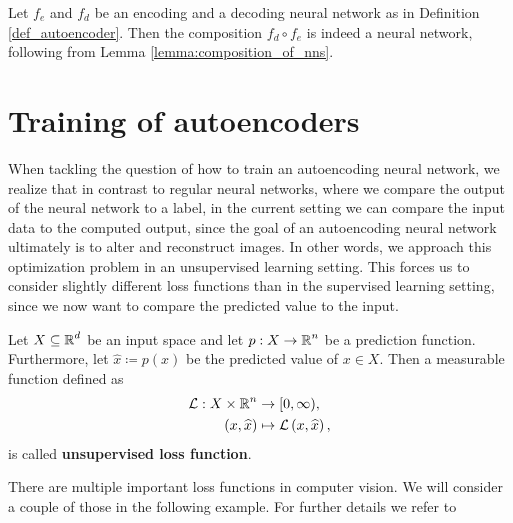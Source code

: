\begin{remark}
Let $f_e$ and $f_d$ be an encoding and a decoding neural network as in Definition \ref{def_autoencoder}. Then the composition $f_d \circ f_e$ is indeed a neural network, following from Lemma \ref{lemma:composition_of_nns}.
\end{remark}


\section{Training of autoencoders}

When tackling the question of how to train an autoencoding neural network, we realize that in contrast to regular neural networks, where we compare the output of the neural network to a label, in the current setting we can compare the input data to the computed output, since the goal of an autoencoding neural network ultimately is to alter and reconstruct images. In other words, we approach this optimization problem in an unsupervised learning setting. This forces us to consider slightly different loss functions than in the supervised learning setting, since we now want to compare the predicted value to the input.


\begin{definition}
Let $X\subseteq \operatorname{\mathbb{R}}^{d}$ be an input space and let $p:X\to \operatorname{\mathbb{R}}^{n}$ be a prediction function. Furthermore, let $\hat{x}\coloneqq p(x)$ be the predicted value of $x\in X$. Then a measurable function defined as
\begin{align*}
\operatorname{\mathcal{L}}:X \times \operatorname{\mathbb{R}}^{n} &\to [0, \infty),\\
\left(x, \widehat{x}\right) &\mapsto \operatorname{\mathcal{L}}\left(x, \widehat{x}\right),
\end{align*}
is called \textbf{unsupervised loss function}.
\end{definition}


There are multiple important loss functions in computer vision. We will consider a couple of those in the following example. For further details we refer to \cite{foster2022generative}


